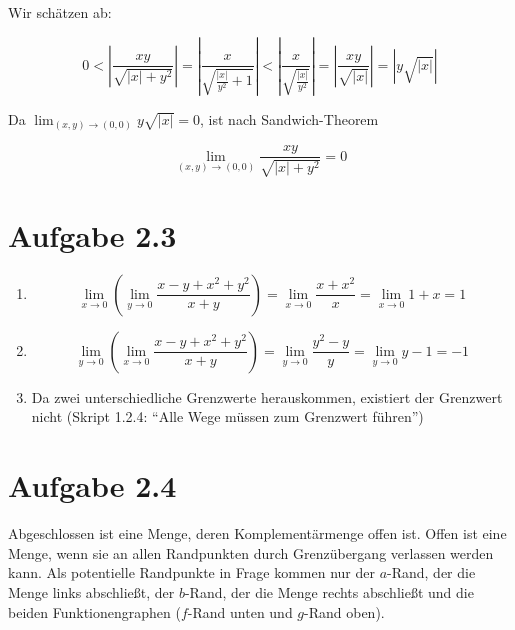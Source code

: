 \documentclass[a4paper,german,12pt,smallheadings]{scrartcl}
\begin{document}
Wir schätzen ab:

\begin{equation*}
  0 <
  \left| \frac{xy}{\sqrt{|x| + y^2}}          \right| =
  \left| \frac{x}{\sqrt{\frac{|x|}{y^2} + 1}} \right| <
  \left| \frac{x}{\sqrt{\frac{|x|}{y^2}}}     \right| =
  \left| \frac{xy}{\sqrt{|x|}}                \right| =
  \left| y\sqrt{|x|}                          \right|
\end{equation*}

Da $\lim_{(x,y) \to (0,0)} y\sqrt{|x|} = 0$, ist nach Sandwich-Theorem

\begin{equation*}
  \lim_{(x,y) \to (0,0)} \frac{xy}{\sqrt{|x| + y^2}} = 0
\end{equation*}

\section*{Aufgabe 2.3}

\begin{enumerate}[(1)]
  \item
    \begin{equation*}
      \lim_{x \to 0} \left( \lim_{y \to 0} \frac{x-y+x^2+y^2}{x+y} \right) =
      \lim_{x \to 0} \frac{x+x^2}{x}  =
      \lim_{x \to 0} 1+x =
      1
    \end{equation*}
  \item
    \begin{equation*}
      \lim_{y \to 0} \left( \lim_{x \to 0} \frac{x-y+x^2+y^2}{x+y} \right) =
      \lim_{y \to 0} \frac{y^2-y}{y} =
      \lim_{y \to 0} y-1 =
      -1
    \end{equation*}
  \item
    Da zwei unterschiedliche Grenzwerte herauskommen, existiert der Grenzwert
    nicht (Skript 1.2.4: ``Alle Wege müssen zum Grenzwert führen'')
\end{enumerate}

\section*{Aufgabe 2.4}

Abgeschlossen ist eine Menge, deren Komplementärmenge offen ist. Offen ist eine
Menge, wenn sie an allen Randpunkten durch Grenzübergang verlassen werden
kann. Als potentielle Randpunkte in Frage kommen nur der $a$-Rand, der die
Menge links abschließt, der $b$-Rand, der die Menge rechts abschließt und die
beiden Funktionengraphen ($f$-Rand unten und $g$-Rand oben).
\end{document}
